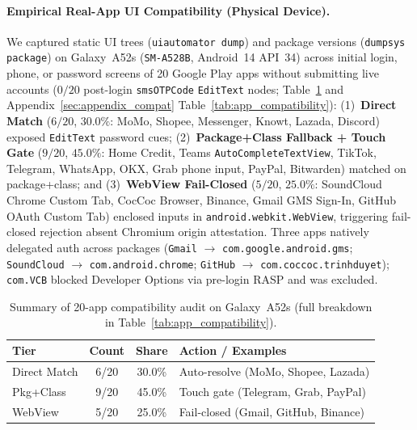 \paragraph{Empirical Real-App UI Compatibility (Physical Device).}
We captured static UI trees (\texttt{uiautomator dump}) and package versions (\texttt{dumpsys package}) on Galaxy~A52s (\texttt{SM-A528B}, Android~14 API~34) across initial login, phone, or password screens of 20 Google Play apps without submitting live accounts ($0/20$ post-login \texttt{smsOTPCode} \texttt{EditText} nodes; Table~\ref{tab:compat_summary} and Appendix~\ref{sec:appendix_compat} Table~\ref{tab:app_compatibility}): (1)~\textbf{Direct Match} ($6/20$, $30.0\%$: MoMo, Shopee, Messenger, Knowt, Lazada, Discord) exposed \texttt{EditText} password cues; (2)~\textbf{Package+Class Fallback + Touch Gate} ($9/20$, $45.0\%$: Home Credit, Teams \texttt{AutoCompleteTextView}, TikTok, Telegram, WhatsApp, OKX, Grab phone input, PayPal, Bitwarden) matched on package+class; and (3)~\textbf{WebView Fail-Closed} ($5/20$, $25.0\%$: SoundCloud Chrome Custom Tab, CocCoc Browser, Binance, Gmail GMS Sign-In, GitHub OAuth Custom Tab) enclosed inputs in \texttt{android.webkit.WebView}, triggering fail-closed rejection absent Chromium origin attestation. Three apps natively delegated auth across packages (\texttt{Gmail} $\rightarrow$ \texttt{com.google.android.gms}; \texttt{SoundCloud} $\rightarrow$ \texttt{com.android.chrome}; \texttt{GitHub} $\rightarrow$ \texttt{com.coccoc.trinhduyet}); \texttt{com.VCB} blocked Developer Options via pre-login RASP and was excluded.

\begin{table}[h]
\centering\scriptsize
\caption{Summary of 20-app compatibility audit on Galaxy~A52s (full breakdown in Table~\ref{tab:app_compatibility}).}
\label{tab:compat_summary}
\setlength{\tabcolsep}{2.5pt}
\begin{tabular*}{\columnwidth}{@{\extracolsep{\fill}}lccl@{}}
\toprule
Tier & Count & Share & Action / Examples \\
\midrule
Direct Match & 6/20 & 30.0\% & Auto-resolve (MoMo, Shopee, Lazada) \\
Pkg+Class & 9/20 & 45.0\% & Touch gate (Telegram, Grab, PayPal) \\
WebView & 5/20 & 25.0\% & Fail-closed (Gmail, GitHub, Binance) \\
\bottomrule
\end{tabular*}
\end{table}

